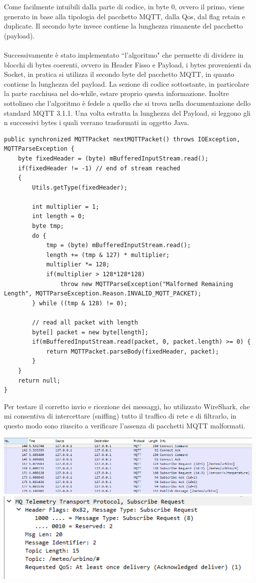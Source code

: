 \documentclass{article}
\begin{document}
Come facilmente intuibili dalla parte di codice, in byte 0, ovvero il primo, viene generato in base alla tipologia del pacchetto MQTT, dalla Qos, dal flag retain e duplicate. Il secondo byte invece contiene la lunghezza rimanente del pacchetto (payload).\\\\
Successivamente è stato implementato ``l'algoritmo" che permette di dividere in blocchi di bytes coerenti, ovvero in Header Fisso e Payload, i bytes provenienti da Socket, in pratica si utilizza il secondo byte del pacchetto MQTT, in quanto contiene la lunghezza del payload. La sezione di codice sottostante, in particolare la parte racchiusa nel do-while, estare proprio questa informazione. Inoltre sottolineo che l'algoritmo è fedele a quello che si trova nella documentazione dello standard MQTT 3.1.1. Una volta estratta la lunghezza del Payload, si leggono gli n successivi bytes i quali verrano trasformati in oggetto Java. 
\begin{lstlisting}
public synchronized MQTTPacket nextMQTTPacket() throws IOException, MQTTParseException {
	byte fixedHeader = (byte) mBufferedInputStream.read();
	if(fixedHeader != -1) // end of stream reached
	{
		Utils.getType(fixedHeader);
		
		int multiplier = 1;
		int length = 0;
		byte tmp;
		do {
			tmp = (byte) mBufferedInputStream.read();
			length += (tmp & 127) * multiplier;
			multiplier *= 128;
			if(multiplier > 128*128*128)
				throw new MQTTParseException("Malformed Remaining Length", MQTTParseException.Reason.INVALID_MQTT_PACKET);
		} while ((tmp & 128) != 0);
		
		// read all packet with length
		byte[] packet = new byte[length];
		if(mBufferedInputStream.read(packet, 0, packet.length) >= 0) {
			return MQTTPacket.parseBody(fixedHeader, packet);
		}
	}
	return null;
}
\end{lstlisting}
Per testare il corretto invio e ricezione dei messaggi, ho utilizzato WireShark, che mi consentiva di intercettare (sniffing) tutto il traffico di rete e di filtrarlo, in questo modo sono riuscito a verificare l'assenza di pacchetti MQTT malformati.
\begin{center}
	\includegraphics[scale=0.5]{immagini/wireshark1.png}
	\includegraphics[scale=0.5]{immagini/wireshark2.png}
\end{center}
\end{document}
